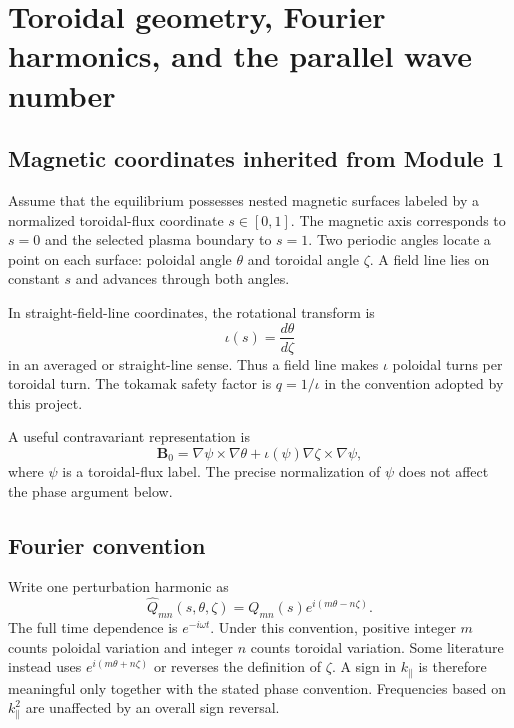 \section{Toroidal geometry, Fourier harmonics, and the parallel wave number}
\label{sec:parallel_structure}

\subsection{Magnetic coordinates inherited from Module 1}
Assume that the equilibrium possesses nested magnetic surfaces labeled by a normalized toroidal-flux coordinate $s\in[0,1]$. The magnetic axis corresponds to $s=0$ and the selected plasma boundary to $s=1$. Two periodic angles locate a point on each surface: poloidal angle $\theta$ and toroidal angle $\zeta$. A field line lies on constant $s$ and advances through both angles.

In straight-field-line coordinates, the rotational transform is
\begin{equation}
\iota(s)=\frac{d\theta}{d\zeta}
\end{equation}
in an averaged or straight-line sense. Thus a field line makes $\iota$ poloidal turns per toroidal turn. The tokamak safety factor is $q=1/\iota$ in the convention adopted by this project.

A useful contravariant representation is
\begin{equation}
\mathbf B_0=\nabla\psi\times\nabla\theta+\iota(\psi)\nabla\zeta\times\nabla\psi,
\label{eq:b_contravariant_straight}
\end{equation}
where $\psi$ is a toroidal-flux label. The precise normalization of $\psi$ does not affect the phase argument below.

\subsection{Fourier convention}
Write one perturbation harmonic as
\begin{equation}
\widehat Q_{mn}(s,\theta,\zeta)
=Q_{mn}(s)e^{i(m\theta-n\zeta)}.
\label{eq:fourier_convention_mod4}
\end{equation}
The full time dependence is $e^{-i\omega t}$. Under this convention, positive integer $m$ counts poloidal variation and integer $n$ counts toroidal variation. Some literature instead uses $e^{i(m\theta+n\zeta)}$ or reverses the definition of $\zeta$. A sign in $k_\parallel$ is therefore meaningful only together with the stated phase convention. Frequencies based on $k_\parallel^2$ are unaffected by an overall sign reversal.

